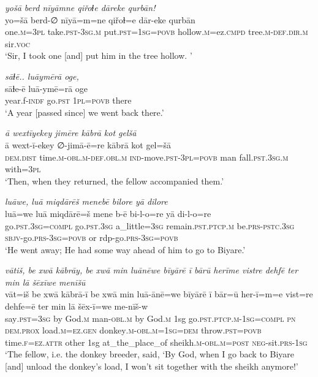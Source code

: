 \ea \label{ZQ.26}
\textit{yošā berd nīyāmne qiřoɫe dāreke qurbān!} \\ 
\gll yo=šā berd-∅ nīyā=m=ne qiřoɫ=e dār-eke qurbān \\ 
 one\textsc{.m}\textsc{=3pl} take\textsc{.pst}\textsc{-3sg}\textsc{.m} put\textsc{.pst}\textsc{=\textsc{1sg}}\textsc{=\textsc{povb}} hollow\textsc{.m}=ez\textsc{.cmpd} tree\textsc{.m}\textsc{-def}\textsc{.dir}\textsc{.m} sir.\textsc{voc} \\ 
\glt `Sir, I took one [and] put him in the tree hollow. '
\z 
 
\ea \label{ZQ.28}
\textit{sāɫē.. luāymērā oge,} \\ 
\gll sāɫe-ē luā-ymē=rā oge \\ 
 year.f\textsc{-indf} go\textsc{.pst} \textsc{1pl}\textsc{=\textsc{povb}} there \\ 
\glt `A year [passed since] we went back there.'
\z 
 
\ea \label{HB.59}
\textit{ā wextīyekey jimēre kābrā kot gelšā} \\ 
\gll ā wext-ī-ekey ∅-jimā-ē=re kābrā kot gel=šā \\ 
 \textsc{dem.dist} time\textsc{.m}\textsc{-obl}\textsc{.m}\textsc{-def}\textsc{.obl}\textsc{.m} \textsc{ind-}move\textsc{.pst}\textsc{-3pl}\textsc{=\textsc{povb}} man fall\textsc{.pst}\textsc{.3sg}\textsc{.m} with\textsc{=3pl} \\ 
\glt `Then, when they returned, the fellow accompanied them.'
\z 
 
\ea \label{HB.64}
\textit{luāwe, luā miqdārēš menebē bilore yā dilore} \\ 
\gll luā=we luā miqdārē=š mene b-ē bi-l-o=re yā di-l-o=re \\ 
 go\textsc{.pst}\textsc{.3sg}\textsc{=\textsc{compl}} go\textsc{.pst}\textsc{.3sg} a\_little\textsc{=3sg} remain\textsc{.pst}\textsc{.ptcp}\textsc{.m} be\textsc{.prs}\textsc{-pstc}\textsc{.3sg} \textsc{sbjv-}go\textsc{.prs}\textsc{-3sg}\textsc{=\textsc{povb}} or rdp-go\textsc{.prs}\textsc{-3sg}\textsc{=\textsc{povb}} \\ 
\glt `He went away; He had some way ahead of him to go to Biyare.'
\z 
 
\ea \label{HB.67}
\textit{vātiš, be xwā kābrāy, be xwā min luānēwe bīyārē ī bārū herīme vistre dehfē ter min lā šēxīwe menīšū} \\ 
\gll vāt=iš be xwā kābrā-ī be xwā min luā-ānē=we bīyārē ī bār=ū her-ī=m=e vist=re dehfe=ē ter min lā šēx-ī=we me-nīš-w \\ 
 say\textsc{.pst}\textsc{=3sg} by God\textsc{.m} man\textsc{-obl}\textsc{.m} by God\textsc{.m} 1sg go\textsc{.pst}\textsc{.ptcp}\textsc{.m}\textsc{-1sg}\textsc{=\textsc{compl}} \textsc{pn} \textsc{dem.prox} load\textsc{.m}\textsc{=ez}\textsc{.gen} donkey\textsc{.m}\textsc{-obl}\textsc{.m}\textsc{=1sg}\textsc{=dem} throw\textsc{.pst}\textsc{=\textsc{povb}} time\textsc{\textsc{.f}}\textsc{=ez}.\textsc{attr} other 1sg at\_the\_place\_of sheikh\textsc{.m}\textsc{-obl}\textsc{.m}\textsc{=\textsc{post}} \textsc{neg-}sit\textsc{.prs}\textsc{-1sg} \\ 
\glt `The fellow, i.e. the donkey breeder, said, ‘By God, when I go back to Biyare [and] unload the donkey’s load, I won’t sit together with the sheikh anymore!'
\z 
 
